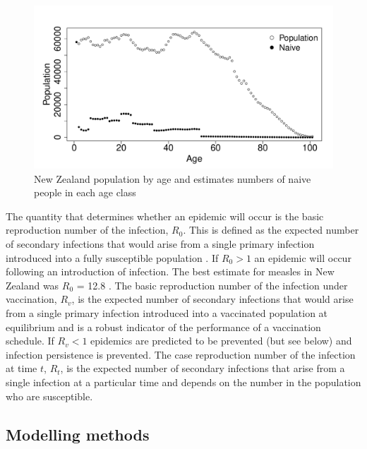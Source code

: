 \documentclass{article}
\begin{document}
\begin{figure}[h!]
\begin{center}
\includegraphics{interimreport2-020}
\end{center}
\caption{New Zealand population by age and estimates numbers of naive people in each age class}
\label{fig:naive}
\end{figure}

The quantity that determines whether an epidemic will occur is the basic reproduction number of the infection, $R_0$. This is defined as the expected number of secondary infections that would arise from a single primary infection introduced into a fully susceptible population \citep{anderson91, diekmann0}. If $R_0 > 1$ an epidemic will occur following an introduction of infection. The best estimate for measles in New Zealand was $R_0$ = 12.8 \citep{roberts4}. The basic reproduction number of the infection under vaccination, $R_v$, is the expected number of secondary infections that would arise from a single primary infection introduced into a vaccinated population at equilibrium and is a robust indicator of the performance of a vaccination schedule. If $R_v < 1$ epidemics are predicted to be prevented (but see below) and infection persistence is prevented. The case reproduction number of the infection at time $t$, $R_t$, is the expected number of secondary infections that arise from a single infection at a particular time and depends on the number in the population who are susceptible.

\subsection{Modelling methods}
\end{document}

